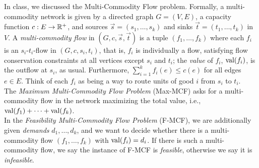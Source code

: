 \documentclass[12pt,a4]{article}
\begin{document}
In class, we discussed the Multi-Commodity Flow problem. Formally, a multi-commodity network is 
given by a directed graph $G = (V,E)$, a capacity function $c: E \rightarrow \mathbb{R}^+$, and 
sources $\vec{s} = (s_1,\dots,s_k)$ and sinks $\vec{t} = (t_1,\dots,t_k)$ in $V$.
A {\em multi-commodity flow} in $(G,c,\vec{s}, \vec{t})$ is a tuple $(f_1,\dots,f_k)$ 
where each $f_i$ is an $s_i$-$t_i$-flow in $(G,c, s_i, t_i)$, that is, $f_i$ is individually a flow, satisfying 
flow conservation constraints at all vertices except $s_i$ and $t_i$; the {\em value} of $f_i$, $\textnormal{val}(f_i)$,
is the outflow at $s_i$, as usual. Furthermore,
$ \sum_{i=1}^k f_i(e) \leq c(e)$ for all edges $e \in E$. Think of each $f_i$ as being a way to route
units of good $i$ from $s_i$ to $t_i$. \\

The {\em Maximum Multi-Commodity Flow Problem} (Max-MCF) asks for a multi-commodity flow
in the network maximizing the total value, i.e., $\textnormal{val}(f_1) + \cdots + \textnormal{val}(f_k)$.\\

In the {\em Feasibility Multi-Commodity Flow Problem} (F-MCF), we are additionally given {\em demands}
$d_1,\dots,d_k$, and we want to decide whether there is a multi-commodity flow $(f_1,\dots,f_k)$
with $\textnormal{val}(f_i) = d_i$. If there is such a multi-commodity flow, we say the instance of F-MCF is {\em feasible},
otherwise we say it is {\em infeasible}.
\end{document}
